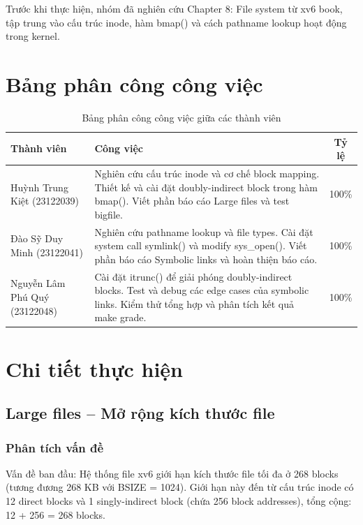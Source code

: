 \documentclass[12pt,a4paper]{article}
\begin{document}
Trước khi thực hiện, nhóm đã nghiên cứu Chapter 8: File system từ xv6 book, tập trung vào cấu trúc inode, hàm bmap() và cách pathname lookup hoạt động trong kernel.

\section{Bảng phân công công việc}

\begin{table}[H]
\centering
\caption{Bảng phân công công việc giữa các thành viên}
\begin{tabular}{|p{3.5cm}|p{9cm}|c|}
\hline
\textbf{Thành viên} & \textbf{Công việc} & \textbf{Tỷ lệ} \\
\hline
Huỳnh Trung Kiệt (23122039) & 
Nghiên cứu cấu trúc inode và cơ chế block mapping. Thiết kế và cài đặt doubly-indirect block trong hàm bmap(). Viết phần báo cáo Large files và test bigfile. & 100\% \\
\hline
Đào Sỹ Duy Minh (23122041) & 
Nghiên cứu pathname lookup và file types. Cài đặt system call symlink() và modify sys\_open(). Viết phần báo cáo Symbolic links và hoàn thiện báo cáo. & 100\% \\
\hline
Nguyễn Lâm Phú Quý (23122048) & 
Cài đặt itrunc() để giải phóng doubly-indirect blocks. Test và debug các edge cases của symbolic links. Kiểm thử tổng hợp và phân tích kết quả make grade. & 100\% \\
\hline
\end{tabular}
\end{table}

\section{Chi tiết thực hiện}

\subsection{Large files -- Mở rộng kích thước file}

\subsubsection{Phân tích vấn đề}

Vấn đề ban đầu: Hệ thống file xv6 giới hạn kích thước file tối đa ở 268 blocks (tương đương 268 KB với BSIZE = 1024). Giới hạn này đến từ cấu trúc inode có 12 direct blocks và 1 singly-indirect block (chứa 256 block addresses), tổng cộng: 12 + 256 = 268 blocks.
\end{document}
